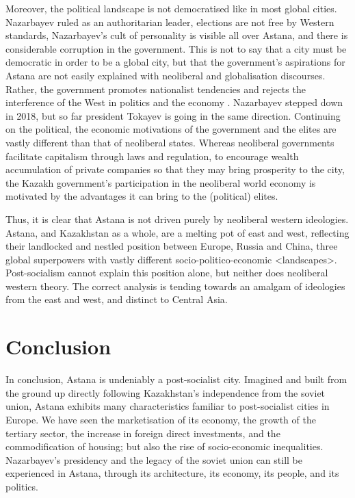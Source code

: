 \documentclass{article}
\begin{document}
Moreover, the political landscape is not democratised like in most global cities. Nazarbayev ruled as an authoritarian leader, elections are not free by Western standards, Nazarbayev's cult of personality is visible all over Astana, and there is considerable corruption in the government. This is not to say that a city must be democratic in order to be a global city, but that the government's aspirations for Astana are not easily explained with neoliberal and globalisation discourses. Rather, the government promotes nationalist tendencies and rejects the interference of the West in politics and the economy \parencite{koch2013not}. Nazarbayev stepped down in 2018, but so far president Tokayev is going in the same direction.
Continuing on the political, the economic motivations of the government and the elites are vastly different than that of neoliberal states. Whereas neoliberal governments facilitate capitalism through laws and regulation, to encourage wealth accumulation of private companies so that they may bring prosperity to the city, the Kazakh government's participation in the neoliberal world economy is motivated by the advantages it can bring to the (political) elites.

Thus, it is clear that Astana is not driven purely by neoliberal western ideologies. Astana, and Kazakhstan as a whole, are a melting pot of east and west, reflecting their landlocked and nestled position between Europe, Russia and China, three global superpowers with vastly different socio-politico-economic <landscapes>. Post-socialism cannot explain this position alone, but neither does neoliberal western theory. The correct analysis is tending towards an amalgam of ideologies from the east and west, and distinct to Central Asia.

\section{Conclusion}

In conclusion, Astana is undeniably a post-socialist city. Imagined and built from the ground up directly following Kazakhstan's independence from the soviet union, Astana exhibits many characteristics familiar to post-socialist cities in Europe. We have seen the marketisation of its economy, the growth of the tertiary sector, the increase in foreign direct investments, and the commodification of housing; but also the rise of socio-economic inequalities. Nazarbayev's presidency and the legacy of the soviet union can still be experienced in Astana, through its architecture, its economy, its people, and its politics.
\end{document}
